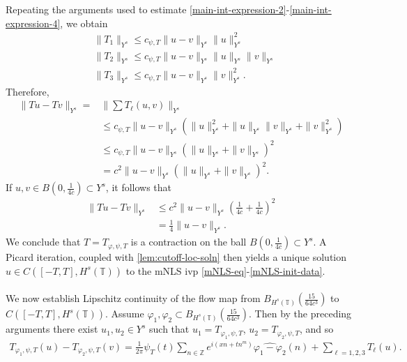 \documentclass[12pt,reqno]{amsart}
\numberwithin{equation}{section}  %
\numberwithin{figure}{section}
\newcommand{\zz}{\mathbb{Z}}
\newcommand{\ci}{\mathbb{T}}
\newcommand{\wh}{\widehat}
\newcommand{\vp}{\varphi}
\theoremstyle{plain}
\theoremstyle{definition}
\theoremstyle{remark}
\begin{document}
Repeating the arguments used to estimate 
\eqref{main-int-expression-2}-\eqref{main-int-expression-4}, we obtain
%
\begin{equation*}
	\begin{split}
    & \|T_1\|_{Y^s} \le c_{\psi,T} \|u -v \|_{Y^s} \|u\|^2_{Y^s}
		\\
    & \|T_2\|_{Y^s} \le c_{\psi,T} \|u -v \|_{Y^s} \|u\|_{Y^s} \|v\|_{Y^s}
		\\
    & \|T_3\|_{Y^s} \le c_{\psi,T} \|u -v \|_{Y^s} \|v\|_{Y^s}^2.
	\end{split}
\end{equation*}
%
Therefore,
%
\begin{equation}
	\label{20a}
	\begin{split}
		\|Tu - Tv \|_{Y^s} = & \| \sum T_\ell(u, v) \|_{Y^s}
		\\
    & \le c_{\psi,T} \|u -v \|_{Y^s} \left( \|u\|_{Y^s}^2 + 
		\|u\|_{Y^s} \|v\|_{Y^s} + \|v\|_{Y^s}^2 \right)
		\\
		& \le c_{\psi,T} \|u -v\|_{Y^s} \left( \|u\|_{Y^s} + \|v\|_{Y^s} \right)^2
		\\
		& = c^2 \|u -v\|_{Y^s} \left( \|u\|_{Y^s} + \|v\|_{Y^s} \right)^2.
	\end{split}
\end{equation}
%
If $u, v \in B(0, \frac{1}{4c}) \subset Y^s$, it follows that
%
\begin{equation}
	\label{21a}
	\begin{split}
		\|Tu - Tv \|_{Y^s}
		& \le c^2 \|u -v \|_{Y^s} \left( \frac{1}{4c} + 
		\frac{1}{4c} \right)^2
		\\
		& = \frac{1}{4} \|u -v \|_{Y^s}. 
	\end{split}
\end{equation}
%
We conclude that $T = T_{\vp, \psi, T}$ is a contraction on the ball $B(0, 
\frac{1}{4c}) \subset Y^s$. A Picard iteration, coupled with
\autoref{lem:cutoff-loc-soln} then yields a unique solution $u \in C(\left[ -T,
T
\right], H^{s}(\ci))$ to the mNLS ivp \eqref{mNLS-eq}-\eqref{mNLS-init-data}.
\\
\\
We now establish Lipschitz continuity of the flow map from
$B_{H^{s}(\ci)}(\frac{15}{64c^{3}})$ to $C(\left[ -T, T \right], H^{s}(\ci))$.
Assume $\vp_1, \vp_2
\subset B_{H^s(\ci)}(\frac{15}{64c^{3}})$.
Then by the preceding arguments there exist $u_1, u_2 \in Y^s$ such that 
$u_1 = T_{\vp_1, \psi, T}$, $u_2 = T_{\vp_2, \psi, T}$, and so
%
%
\begin{equation*}
	\begin{split}
		T_{\vp_1, \psi, T}(u) -
    T_{\vp_2, \psi, T}(v) = \frac{1}{2\pi} \psi_{T}(t) \sum_{n \in
		\zz}e^{i\left( xn + tn^{m} \right)} \wh{\vp_1 - \vp_2}(n) + \sum_{\ell
		= 1,2,3} T_{\ell}(u).
	\end{split}
\end{equation*}
\end{document}

